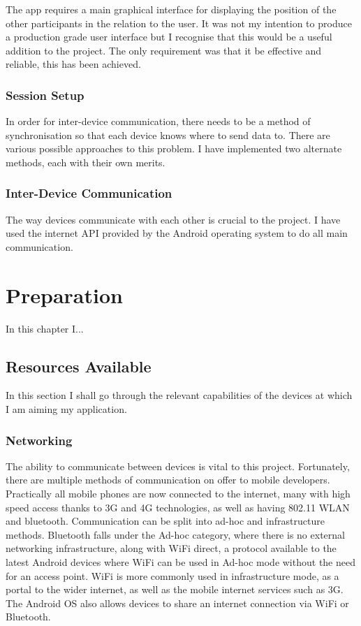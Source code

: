 The app requires a main graphical interface for displaying the position of the other participants in the relation to the user. It was not my intention to produce a production grade user interface but I recognise that this would be a useful addition to the project. The only requirement was that it be effective and reliable, this has been achieved.

\subsection{Session Setup}

In order for inter-device communication, there needs to be a method of synchronisation so that each device knows where to send data to. There are various possible approaches to this problem. I have implemented two alternate methods, each with their own merits.

\subsection{Inter-Device Communication}

The way devices communicate with each other is crucial to the project. I have used the internet API provided by the Android operating system to do all main communication.

\cleardoublepage

\chapter{Preparation}

In this chapter I...

\section{Resources Available}

In this section I shall go through the relevant capabilities of the devices at which I am aiming my application.

\subsection{Networking}

The ability to communicate between devices is vital to this project. Fortunately, there are multiple methods of communication on offer to mobile developers.
Practically all mobile phones are now connected to the internet, many with high speed access thanks to 3G and 4G technologies, as well as having 802.11 WLAN and bluetooth.
Communication can be split into ad-hoc and infrastructure methods.
Bluetooth falls under the Ad-hoc category, where there is no external networking infrastructure, along with WiFi direct, a protocol available to the latest Android devices where WiFi can be used in Ad-hoc mode without the need for an access point.
WiFi is more commonly used in infrastructure mode, as a portal to the wider internet, as well as the mobile internet services such as 3G.
The Android OS also allows devices to share an internet connection via WiFi or Bluetooth.

